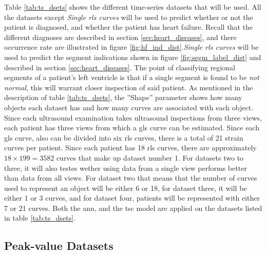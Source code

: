 Table \ref{tab:ts_dsets} shows the different time-series datasets that will be used. 
All the datasets except \textit{Single \acrshort{rls} curves} will be used to predict whether or not the patient is diagnosed, and whether the patient has heart failure. Recall that the different diagnoses are described in section \ref{sec:heart_diseases}, and there occurrence rate are illustrated in figure \ref{fig:hf_ind_dist}.\textit{Single \acrshort{rls} curves} will be used to predict the segment indications shown in figure \ref{fig:segm_label_dist} and described in section \ref{sec:heart_diseases}. The point of classifying regional segments of a patient's left ventricle is that if a single segment is found to be \textit{not normal}, this will warrant closer inspection of said patient. As mentioned in the description of table \ref{tab:ts_dsets}, the ''Shape'' parameter shows how many objects each dataset has and how many curves are associated with each object. Since each ultrasound examination takes ultrasound inspections from three views, each patient has three views from which a  \acrshort{gls} curve can be estimated. Since each \acrshort{gls} curve, also can be divided into six \acrshort{rls} curves, there is a total of 21 strain curves per patient. Since each patient has 18 \acrshort{rls} curves, there are approximately $18 \times 199 = 3582$ curves that make up dataset number 1. For datasets two to three, it will also testes wether using data from a single view performs better than data from all views. For dataset two that means that the number of curves used to represent an object will be either 6 or 18, for dataset three, it will be either 1 or 3 curves, and for dataset four, patients will be represented with either 7 or 21 curves. Both the \acrshort{ann}, and the \acrshort{tsc} model are applied on the datasets listed in table \ref{tab:ts_dsets}. \bigskip

\subsection{Peak-value Datasets}

